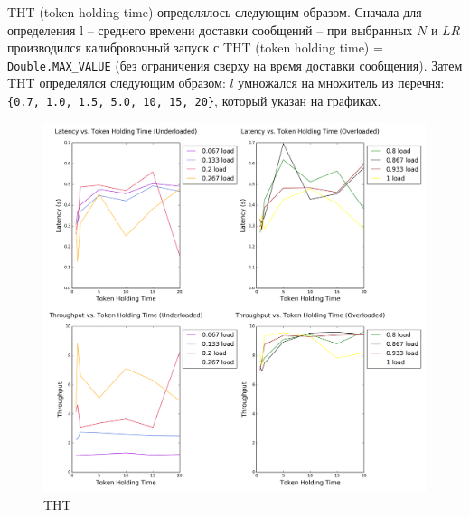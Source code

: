 \documentclass{article}
\begin{document}
THT (token holding time) определялось следующим образом. Сначала  для определения l – среднего времени доставки сообщений – при выбранных $N$ и $LR$ производился калибровочный запуск с THT (token holding time) = \lstinline|Double.MAX_VALUE| (без ограничения сверху на время доставки сообщения). Затем THT определялся следующим образом: $l$ умножался на множитель из перечня: \lstinline|{0.7, 1.0, 1.5, 5.0, 10, 15, 20}|, который указан на графиках.

\newpage
\begin{figure}[H]
\centering
\includegraphics[width=1.5\textwidth]{Plots/THT.png}
\caption{THT}
\end{figure}


\newpage
% 

% 

% 

% 

% 

% 
\end{document}
